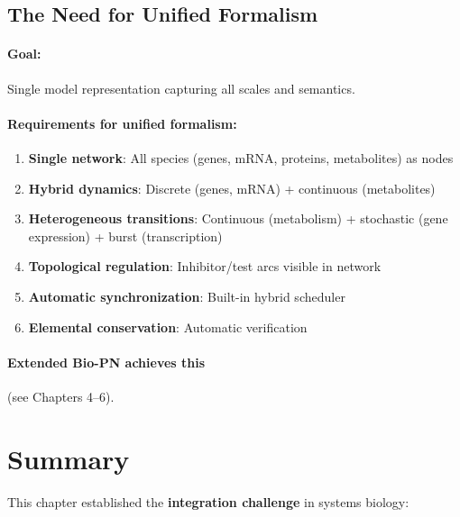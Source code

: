 \subsection{The Need for Unified Formalism}
\label{subsec:unified-formalism}

\paragraph{Goal:} Single model representation capturing all scales and semantics.

\paragraph{Requirements for unified formalism:}
\begin{enumerate}
    \item \textbf{Single network}: All species (genes, mRNA, proteins, metabolites) as nodes
    \item \textbf{Hybrid dynamics}: Discrete (genes, mRNA) + continuous (metabolites)
    \item \textbf{Heterogeneous transitions}: Continuous (metabolism) + stochastic (gene expression) + burst (transcription)
    \item \textbf{Topological regulation}: Inhibitor/test arcs visible in network
    \item \textbf{Automatic synchronization}: Built-in hybrid scheduler
    \item \textbf{Elemental conservation}: Automatic verification
\end{enumerate}

\paragraph{Extended Bio-PN achieves this} (see Chapters 4--6).

\section{Summary}
\label{sec:chapter3-summary}

This chapter established the \textbf{integration challenge} in systems biology:

